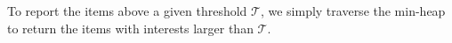 %
%




To report the items above a given threshold $\mathcal{T}$, we simply traverse the min-heap to return the items with interests larger than $\mathcal{T}$. 

